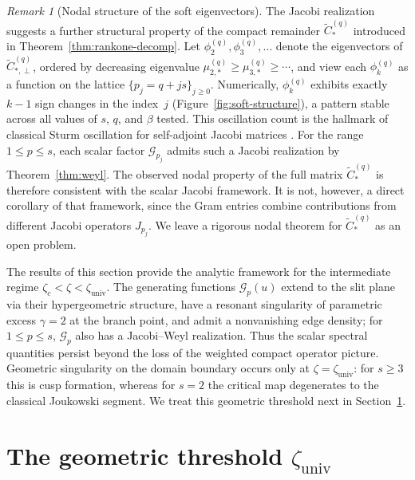 \documentclass[11pt]{amsart}
\numberwithin{equation}{section}
\theoremstyle{plain}
\theoremstyle{definition}
\theoremstyle{remark}
\newtheorem{remark}[theorem]{Remark}
\begin{document}
\begin{remark}[Nodal structure of the soft eigenvectors]
	\label{rem:nodal}
	The Jacobi realization suggests a further structural property of the
	compact remainder $\widetilde C^{(q)}_*$ introduced in
	Theorem~\ref{thm:rankone-decomp}.  Let
	$\phi_2^{(q)},\phi_3^{(q)},\ldots$ denote the eigenvectors of
	$\widetilde C^{(q)}_{*,\perp}$, ordered by decreasing eigenvalue
	$\mu_{2,*}^{(q)}\ge\mu_{3,*}^{(q)}\ge\cdots$, and view each $\phi_k^{(q)}$
	as a function on the lattice $\{p_j=q+js\}_{j\ge0}$.  Numerically,
	$\phi_k^{(q)}$ exhibits exactly $k-1$ sign changes in the index~$j$
	(Figure~\ref{fig:soft-structure}), a pattern stable across
	all values of $s$, $q$, and $\beta$ tested.  This oscillation count
	is the hallmark of classical Sturm oscillation for self-adjoint Jacobi
	matrices \cite[Ch.~III]{Akhiezer1965}.  For the range $1\le p\le s$,
	each scalar factor $\mathcal G_{p_j}$ admits such a Jacobi realization by
	Theorem~\ref{thm:weyl}. The observed nodal property of the full
	matrix $\widetilde C^{(q)}_*$ is therefore consistent with the scalar Jacobi framework. It is not, however, a direct corollary of that framework, since the Gram entries combine contributions from different Jacobi operators
	$J_{p_j}$.  We leave a rigorous nodal theorem for
	$\widetilde C^{(q)}_*$ as an open problem.
\end{remark}



The results of this section provide the analytic framework for the
intermediate regime \(\zeta_c<\zeta<\zeta_{\mathrm{univ}}\). The generating
functions \(\mathcal G_p(u)\) extend to the slit plane via their
hypergeometric structure, have a resonant singularity of parametric excess
\(\gamma=2\) at the branch point, and admit a nonvanishing edge density; for
\(1\le p\le s\), \(\mathcal G_p\) also has a Jacobi--Weyl realization.
Thus the scalar spectral quantities persist beyond the loss of the weighted compact
operator picture. Geometric singularity on the domain boundary occurs only at
\(\zeta=\zeta_{\mathrm{univ}}\): for \(s\ge3\) this is cusp formation,
whereas for \(s=2\) the critical map degenerates to the classical Joukowski
segment. We treat this geometric threshold next in
Section~\ref{sec:univalence}.

\FloatBarrier


\section{The geometric threshold \texorpdfstring{$\zeta_{\mathrm{univ}}$}{zeta-univ}}
\label{sec:univalence}
\end{document}
